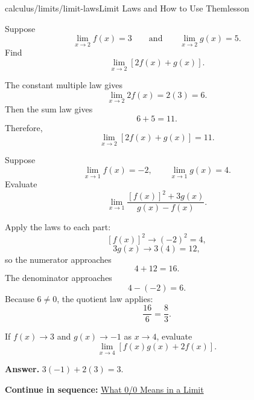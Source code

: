 \documentclass[11pt,openany]{book}
\theoremstyle{bgplain}
\newcounter{bgexample}[chapter]
\newcommand{\webnext}[2]{%
  \par\addvspace{1.2em}\noindent{\color{BGLine}\rule{\textwidth}{0.35pt}}\par\smallskip
  {\small\color{BGGray}\textbf{Continue in sequence:} \hyperlink{web:#1}{#2}}\par
}
\begin{document}
\begin{webpage}{calculus/limits/limit-laws}{Limit Laws and How to Use Them}{lesson}
\begin{bgguided}[title={Building a limit from known pieces}]
Suppose
\[
  \lim_{x\to2}f(x)=3
  \qquad\text{and}\qquad
  \lim_{x\to2}g(x)=5.
\]
Find
\[
  \lim_{x\to2}[2f(x)+g(x)].
\]

\begin{bgsolution}
The constant multiple law gives
\[
  \lim_{x\to2}2f(x)=2(3)=6.
\]
Then the sum law gives
\[
  6+5=11.
\]
Therefore,
\[
  \boxed{\lim_{x\to2}[2f(x)+g(x)]=11}.
\]
\end{bgsolution}
\end{bgguided}

\begin{bgexample}[title={Several laws at once}]
Suppose
\[
  \lim_{x\to1}f(x)=-2,
  \qquad
  \lim_{x\to1}g(x)=4.
\]
Evaluate
\[
  \lim_{x\to1}\frac{[f(x)]^2+3g(x)}{g(x)-f(x)}.
\]

\begin{bgsolution}
Apply the laws to each part:
\[
  [f(x)]^2\to(-2)^2=4,
\]
\[
  3g(x)\to3(4)=12,
\]
so the numerator approaches
\[
  4+12=16.
\]
The denominator approaches
\[
  4-(-2)=6.
\]
Because \(6\ne0\), the quotient law applies:
\[
  \boxed{\frac{16}{6}=\frac83}.
\]
\end{bgsolution}
\end{bgexample}

\begin{bgquickcheck}
If \(f(x)\to3\) and \(g(x)\to-1\) as \(x\to4\), evaluate
\[
  \lim_{x\to4}[f(x)g(x)+2f(x)].
\]

\textbf{Answer.} \(3(-1)+2(3)=3\).
\end{bgquickcheck}
\webnext{calculus/limits/zero-over-zero}{What 0/0 Means in a Limit}
\end{webpage}
\end{document}
